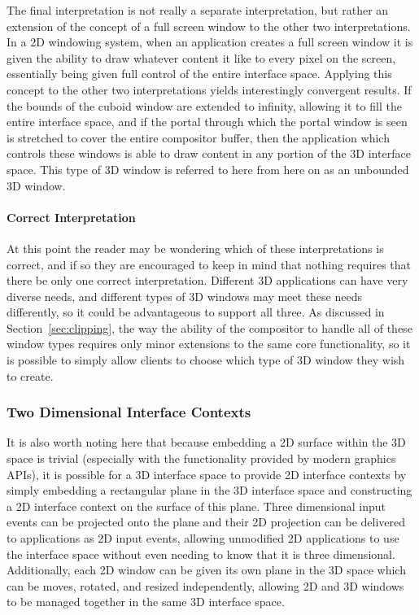 The final interpretation is not really a separate interpretation, but rather an extension of the concept of a full screen window to the other two interpretations. In a 2D windowing system, when an application creates a full screen window it is given the ability to draw whatever content it like to every pixel on the screen, essentially being given full control of the entire interface space. Applying this concept to the other two interpretations yields interestingly convergent results. If the bounds of the cuboid window are extended to infinity, allowing it to fill the entire interface space, and if the portal through which the portal window is seen is stretched to cover the entire compositor buffer, then the application which controls these windows is able to draw content in any portion of the 3D interface space. This type of 3D window is referred to here from here on as an unbounded 3D window.

\paragraph{Correct Interpretation}

At this point the reader may be wondering which of these interpretations is correct, and if so they are encouraged to keep in mind that nothing requires that there be only one correct interpretation. Different 3D applications can have very diverse needs, and different types of 3D windows may meet these needs differently, so it could be advantageous to support all three. As discussed in Section~\ref{sec:clipping}, the way the ability of the compositor to handle all of these window types requires only minor extensions to the same core functionality, so it is possible to simply allow clients to choose which type of 3D window they wish to create.
 
\subsubsection{Two Dimensional Interface Contexts}

It is also worth noting here that because embedding a 2D surface within the 3D space is trivial (especially with the functionality provided by modern graphics APIs), it is possible for a 3D interface space to provide 2D interface contexts by simply embedding a rectangular plane in the 3D interface space and constructing a 2D interface context on the surface of this plane. Three dimensional input events can be projected onto the plane and their 2D projection can be delivered to applications as 2D input events, allowing unmodified 2D applications to use the interface space without even needing to know that it is three dimensional. Additionally, each 2D window can be given its own plane in the 3D space which can be moves, rotated, and resized independently, allowing 2D and 3D windows to be managed together in the same 3D interface space.

